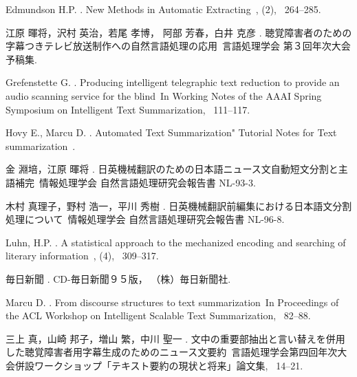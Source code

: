 \begin{thebibliography}{99}
\bibitem[\protect\BCAY{}{}{}]{}
Edmundson H.P. \BBCP. 
\newblock \BBOQ New Methods in Automatic Extracting\BBCQ\
, {} (2), \BPGS\ 264--285.

\bibitem[\protect\BCAY{}{}{}]{}
江原 暉将，沢村 英治，若尾 孝博， 阿部 芳春，白井 克彦 \BBCP. 
\newblock \BBOQ 聴覚障害者のための字幕つきテレビ放送制作への自然言語処理の応用\BBCQ\
\newblock 言語処理学会 第３回年次大会予稿集.

\bibitem[\protect\BCAY{}{}{}]{}
Grefenstette G. \BBCP. 
\newblock \BBOQ Producing intelligent telegraphic text reduction to provide an audio scanning service for the blind\BBCQ\
\newblock In {\Bem Working Notes of the AAAI Spring Symposium on Intelligent Text Summarization}, \BPGS\ 111--117.

\bibitem[\protect\BCAY{}{}{}]{}
Hovy E., Marcu D. \BBOP 1998\BBCP. 
\newblock \BBOQ Automated Text Summarization" Tutorial Notes for Text summarization\BBCQ\
.

\bibitem[\protect\BCAY{}{}{}]{}
金 淵培，江原 暉将 \BBCP. 
\newblock \BBOQ 日英機械翻訳のための日本語ニュース文自動短文分割と主語補完\BBCQ\
\newblock 情報処理学会 自然言語処理研究会報告書 NL-93-3.

\bibitem[\protect\BCAY{}{}{}]{}
木村 真理子，野村 浩一，平川 秀樹 \BBOP 1993\BBCP. 
\newblock \BBOQ 日英機械翻訳前編集における日本語文分割処理について\BBCQ\
\newblock 情報処理学会 自然言語処理研究会報告書 NL-96-8.

\bibitem[\protect\BCAY{}{}{}]{}
Luhn, H.P. \BBOP 1957\BBCP. 
\newblock \BBOQ A statistical approach to the mechanized encoding and searching of literary information\BBCQ\
, {} (4), \BPGS\ 309--317.

\bibitem[\protect\BCAY{}{}{}]{}
毎日新聞 \BBCP. 
\newblock CD-毎日新聞９５版，
\newblock （株）毎日新聞社.

\bibitem[\protect\BCAY{}{}{}]{}
Marcu D. \BBCP. 
\newblock \BBOQ From discourse structures to text summarization\BBCQ\
\newblock In {\Bem Proceedings of the ACL Workshop on Intelligent Scalable Text
Summarization}, \BPGS\ 82--88.

\bibitem[\protect\BCAY{}{}{}]{}
三上 真，山崎 邦子，増山 繁，中川 聖一 \BBCP. 
\newblock \BBOQ 文中の重要部抽出と言い替えを併用した聴覚障害者用字幕生成のためのニュース文要約\BBCQ\
\newblock 言語処理学会第四回年次大会併設ワークショップ「テキスト要約の現状と将来」論文集, \BPGS\ 14--21.


\end{thebibliography}
